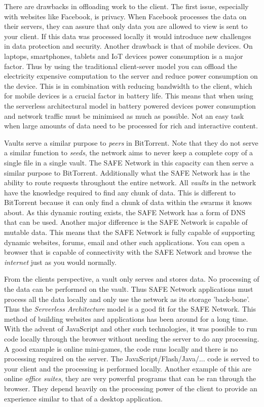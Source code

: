 There are drawbacks in offloading work to the client. The first issue, especially with websites like Facebook, is privacy. When Facebook processes the data on their servers, they can assure that only data you are allowed to view is sent to your client. If this data was processed locally it would introduce new challenges in data protection and security. Another drawback is that of mobile devices. On laptops, smartphones, tablets and IoT devices power consumption is a major factor. Thus by using the traditional client-sever model you can offload the electricity expensive computation to the server and reduce power consumption on the device. This is in combination with reducing bandwidth to the client, which for mobile devices is a crucial factor in battery life. This means that when using the serverless architectural model in battery powered devices power consumption and network traffic must be minimised as much as possible. Not an easy task when large amounts of data need to be processed for rich and interactive content.

Vaults serve a similar purpose to \textit{peers} in BitTorrent. Note that they do not serve a similar function to \textit{seeds}, the network aims to never keep a complete copy of a single file in a single vault. The SAFE Network in this capacity can then serve a similar purpose to BitTorrent. Additionally what the SAFE Network has is the ability to route requests throughout the entire network. All \textit{vaults} in the network have the knowledge required to find any chunk of data. This is different to BitTorrent because it can only find a chunk of data within the swarms it knows about. As this dynamic routing exists, the SAFE Network has a form of DNS that can be used. Another major difference is the SAFE Network is capable of mutable data. This means that the SAFE Network is fully capable of supporting dynamic websites, forums, email and other such applications. You can open a browser that is capable of connectivity with the SAFE Network and browse the \textit{internet} just as you would normally.

From the clients perspective, a vault only serves and stores data. No processing of the data can be performed on the vault. Thus SAFE Network applications must process all the data locally and only use the network as its storage 'back-bone'. Thus the \textit{Serverless Architecture} model is a good fit for the SAFE Network. This method of building websites and applications has been around for a long time. With the advent of JavaScript and other such technologies, it was possible to run code locally through the browser without needing the server to do any processing. A good example is online mini-games, the code runs locally and there is no processing required on the server. The JavaScript/Flash/Java/... code is served to your client and the processing is performed locally. Another example of this are online \textit{office suites}, they are very powerful programs that can be ran through the browser. They depend heavily on the processing power of the client to provide an experience similar to that of a desktop application.


